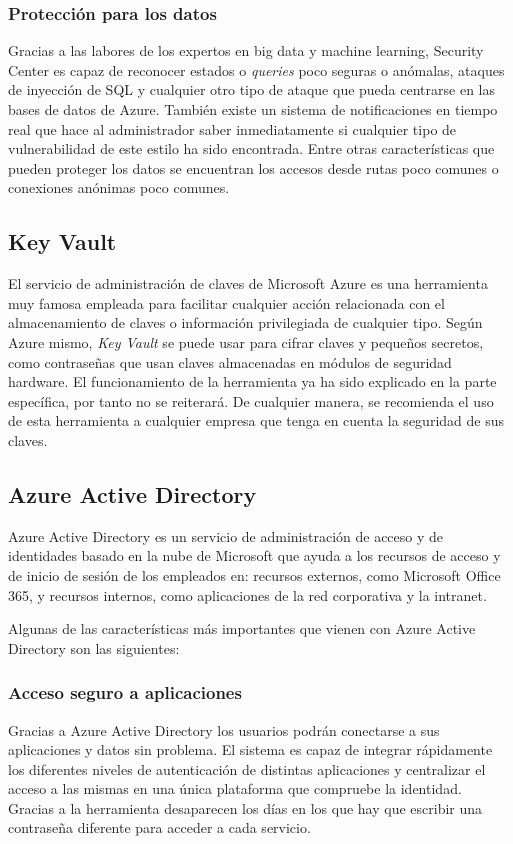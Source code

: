 \documentclass[english,runningheads,a4paper]{llncs}[2018/03/10]
\begin{document}
\subsubsection*{Protección para los datos}
Gracias a las labores de los expertos en big data y machine learning, Security
Center es capaz de reconocer estados o \textit{queries} poco seguras o anómalas,
ataques de inyección de SQL y cualquier otro tipo de ataque que pueda centrarse
en las bases de datos de Azure. También existe un sistema de notificaciones en
tiempo real que hace al administrador saber inmediatamente si cualquier tipo de
vulnerabilidad de este estilo ha sido encontrada. Entre otras características
que pueden proteger los datos se encuentran los accesos desde rutas poco comunes
o conexiones anónimas poco comunes.

\subsection*{Key Vault}

El servicio de administración de claves de Microsoft Azure es una herramienta
muy famosa empleada para facilitar cualquier acción relacionada con el
almacenamiento de claves o información privilegiada de cualquier tipo. Según
Azure mismo, \textit{Key Vault} se puede usar para cifrar claves y pequeños
secretos, como contraseñas que usan claves almacenadas en módulos de seguridad
hardware. El funcionamiento de la herramienta ya ha sido explicado en la parte
específica, por tanto no se reiterará. De cualquier manera, se recomienda el uso
de esta herramienta a cualquier empresa que tenga en cuenta la seguridad de sus
claves.

\subsection*{Azure Active Directory}
Azure Active Directory es un servicio de administración de acceso y de
identidades basado en la nube de Microsoft que ayuda a los recursos de acceso y
de inicio de sesión de los empleados en: recursos externos, como Microsoft
Office 365, y recursos internos, como aplicaciones de la red corporativa y la
intranet.

Algunas de las características más importantes que vienen con Azure Active
Directory son las siguientes:

\subsubsection*{Acceso seguro a aplicaciones}
Gracias a Azure Active Directory los usuarios podrán conectarse a sus
aplicaciones y datos sin problema. El sistema es capaz de integrar rápidamente
los diferentes niveles de autenticación de distintas aplicaciones y centralizar
el acceso a las mismas en una única plataforma que compruebe la identidad.
Gracias a la herramienta desaparecen los días en los que hay que escribir una
contraseña diferente para acceder a cada servicio.
\end{document}

